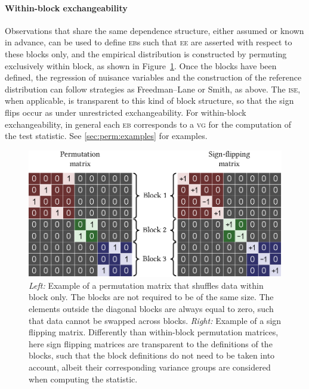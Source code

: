 \paragraph{Within-block exchangeability}

Observations that share the same dependence structure, either assumed or known in advance, can be used to define \textsc{eb}s such that \textsc{ee} are asserted with respect to these blocks only, and the empirical distribution is constructed by permuting exclusively within block, as shown in Figure~\ref{fig:perm:within-block}. Once the blocks have been defined, the regression of nuisance variables and the construction of the reference distribution can follow strategies as Freedman--Lane or Smith, as above. The \textsc{ise}, when applicable, is transparent to this kind of block structure, so that the sign flips occur as under unrestricted exchangeability. For within-block exchangeability, in general each \textsc{eb} corresponds to a \textsc{vg} for the computation of the test statistic. See \ref{sec:perm:examples} for examples.

\begin{figure}[!p]
\centering
\includegraphics{images/within-block.eps}
\caption[Example of permutation and sign flipping matrix for within-block exchangeability]{\emph{\emph{Left:}} Example of a permutation matrix that shuffles data within block only. The blocks are not required to be of the same size. The elements outside the diagonal blocks are always equal to zero, such that data cannot be swapped across blocks. \emph{Right:} Example of a sign flipping matrix. Differently than within-block permutation matrices, here sign flipping matrices are transparent to the definitions of the blocks, such that the block definitions do not need to be taken into account, albeit their corresponding variance groups are considered when computing the statistic.}
\label{fig:perm:within-block}
\end{figure}

